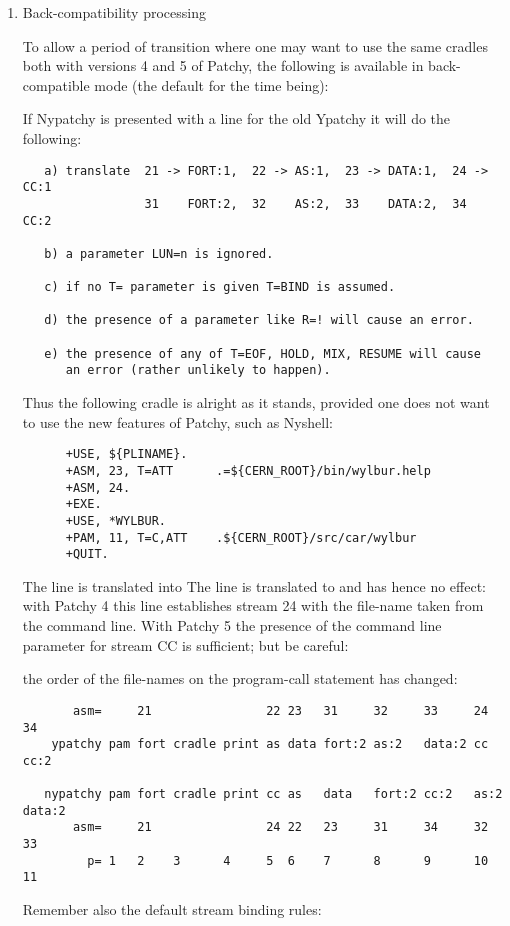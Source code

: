 \begin{enumerate}
\item
Back-compatibility processing

To allow a period of transition where one may want
to use the same cradles both with versions 4 and 5 of Patchy, the
following is available in back-compatible mode (the default for the
time being):

If Nypatchy is presented with a  line for the old Ypatchy
it will do the following:
\begin{verbatim}
   a) translate  21 -> FORT:1,  22 -> AS:1,  23 -> DATA:1,  24 -> CC:1
                 31    FORT:2,  32    AS:2,  33    DATA:2,  34    CC:2

   b) a parameter LUN=n is ignored.

   c) if no T= parameter is given T=BIND is assumed.

   d) the presence of a parameter like R=! will cause an error.

   e) the presence of any of T=EOF, HOLD, MIX, RESUME will cause
      an error (rather unlikely to happen).
\end{verbatim}
Thus the following cradle is alright as it stands, provided one
does not want to use the new features of Patchy, such as Nyshell:
\begin{verbatim}
      +USE, ${PLINAME}.
      +ASM, 23, T=ATT      .=${CERN_ROOT}/bin/wylbur.help
      +ASM, 24.
      +EXE.
      +USE, *WYLBUR.
      +PAM, 11, T=C,ATT    .${CERN_ROOT}/src/car/wylbur
      +QUIT.
\end{verbatim}
The line  is translated into 
The line  is translated to  and has hence
no effect: with Patchy 4 this line establishes stream 24 with the
file-name taken from the command line. With Patchy 5 the presence
of the command line parameter for stream CC is sufficient; but be
careful:

the order of the file-names on the program-call statement has changed:
\begin{verbatim}
       asm=     21                22 23   31     32     33     24   34
    ypatchy pam fort cradle print as data fort:2 as:2   data:2 cc   cc:2

   nypatchy pam fort cradle print cc as   data   fort:2 cc:2   as:2 data:2
       asm=     21                24 22   23     31     34     32   33
         p= 1   2    3      4     5  6    7      8      9      10   11
\end{verbatim}
Remember also the default stream binding rules:


\end{enumerate}
